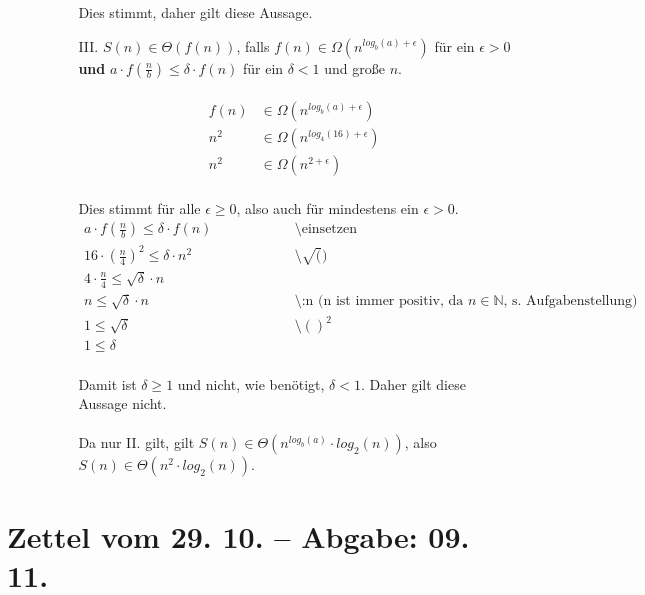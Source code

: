 \documentclass{article}
\begin{document}
\begin{enumerate}
\begin{enumerate}
\begin{enumerate}
    	    Dies stimmt, daher gilt diese Aussage.
    	    \item[III.]
    	    $S(n) \in \Theta (f(n))$, falls $f(n) \in \Omega (n^{log_b(a)+ \epsilon})$ für ein $\epsilon > 0$ \textbf{und} $a \cdot f(\frac{n}{b}) \leq \delta \cdot f(n)$ für ein $\delta < 1$ und große $n$.\\
    	    \\
    	    \[
    	        \begin{array}{ll}
    	            f(n) &\in \Omega (n^{log_b(a)+ \epsilon})\\
    	            n^2 &\in \Omega (n^{log_4(16)+ \epsilon})\\
    	            n^2 &\in \Omega (n^{2+ \epsilon})
    	        \end{array}
    	    \]
    	    \\
    	    Dies stimmt für alle $\epsilon \geq 0$, also auch für mindestens ein $\epsilon > 0$.
    	    \[
    	        \begin{array}{lll}
    	            a \cdot f(\frac{n}{b}) \leq \delta \cdot f(n)~~~~~~~~~~~~~~~~~~~~~~~&\text{\textbackslash einsetzen}\\
    	            16 \cdot (\frac{n}{4})^2 \leq \delta \cdot n^2 &\text{\textbackslash $\sqrt()$}\\
    	            4 \cdot \frac{n}{4} \leq \sqrt{\delta} \cdot n\\
    	            n \leq \sqrt{\delta} \cdot n &\text{\textbackslash :n    (n ist immer positiv, da $n \in \mathbb{N}$, s. Aufgabenstellung)}\\
    	            1 \leq \sqrt{\delta} &\text{\textbackslash $()^2$}\\
    	            1 \leq \delta
    	        \end{array}
    	    \]
    	    \\
    	    Damit ist $\delta \geq 1$ und nicht, wie benötigt, $\delta < 1$. Daher gilt diese Aussage nicht.
    	    \\\\
    	    Da nur II. gilt, gilt $S(n) \in \Theta (n^{log_b(a)} \cdot log_2(n))$, also $S(n) \in \Theta (n^2 \cdot log_2(n))$.
    	\end{enumerate}
    \end{enumerate}
\end{enumerate}
\newpage
\section{Zettel vom 29. 10. -- Abgabe: 09. 11.}
\end{document}
